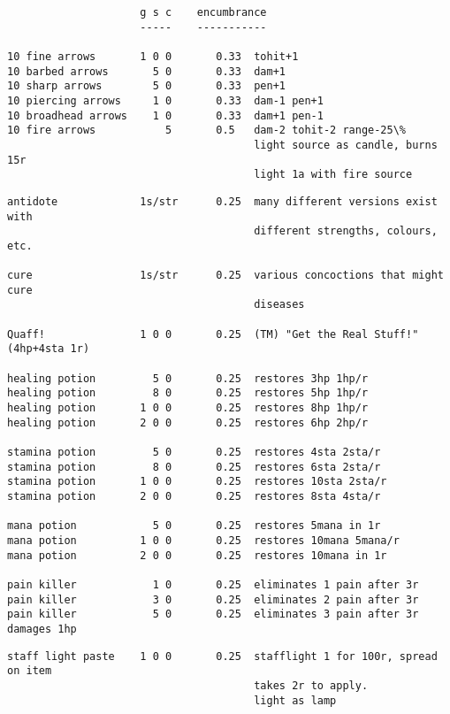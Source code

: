 \small
\begin{verbatim}
                     g s c    encumbrance
                     -----    -----------

10 fine arrows       1 0 0       0.33  tohit+1
10 barbed arrows       5 0       0.33  dam+1
10 sharp arrows        5 0       0.33  pen+1
10 piercing arrows     1 0       0.33  dam-1 pen+1
10 broadhead arrows    1 0       0.33  dam+1 pen-1
10 fire arrows           5       0.5   dam-2 tohit-2 range-25\%
                                       light source as candle, burns 15r
                                       light 1a with fire source

\end{verbatim} \pagebreak[1] \begin{verbatim}
antidote             1s/str      0.25  many different versions exist with
                                       different strengths, colours, etc.

cure                 1s/str      0.25  various concoctions that might cure
                                       diseases

Quaff!               1 0 0       0.25  (TM) "Get the Real Stuff!"  (4hp+4sta 1r)

healing potion         5 0       0.25  restores 3hp 1hp/r
healing potion         8 0       0.25  restores 5hp 1hp/r
healing potion       1 0 0       0.25  restores 8hp 1hp/r
healing potion       2 0 0       0.25  restores 6hp 2hp/r

stamina potion         5 0       0.25  restores 4sta 2sta/r
stamina potion         8 0       0.25  restores 6sta 2sta/r
stamina potion       1 0 0       0.25  restores 10sta 2sta/r
stamina potion       2 0 0       0.25  restores 8sta 4sta/r

mana potion            5 0       0.25  restores 5mana in 1r
mana potion          1 0 0       0.25  restores 10mana 5mana/r
mana potion          2 0 0       0.25  restores 10mana in 1r

pain killer            1 0       0.25  eliminates 1 pain after 3r
pain killer            3 0       0.25  eliminates 2 pain after 3r
pain killer            5 0       0.25  eliminates 3 pain after 3r damages 1hp

\end{verbatim} \pagebreak[1] \begin{verbatim}
staff light paste    1 0 0       0.25  stafflight 1 for 100r, spread on item
                                       takes 2r to apply.
                                       light as lamp


\end{verbatim}
